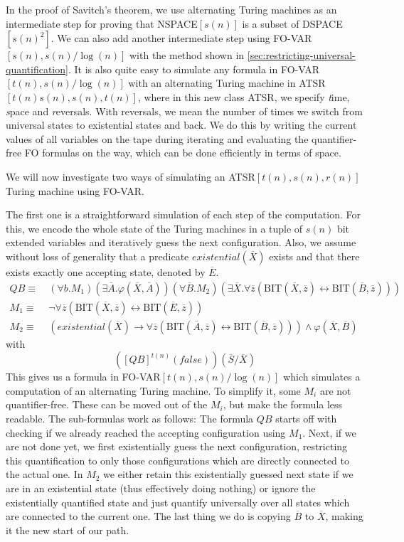 In the proof of Savitch's theorem, we use alternating Turing machines as an intermediate step for proving that NSPACE$[s(n)]$ is a subset of DSPACE$[s(n)^2]$.
We can also add another intermediate step using FO-VAR$[s(n), s(n)/\log(n)]$ with the method shown in \cref{sec:restricting-universal-quantification}.
It is also quite easy to simulate any formula in FO-VAR$[t(n), s(n)/\log(n)]$ with an alternating Turing machine in ATSR$[t(n)s(n), s(n), t(n)]$, where in this new class ATSR, we specify \emph{t}ime, \emph{s}pace and \emph{r}eversals.
With reversals, we mean the number of times we switch from universal states to existential states and back.
We do this by writing the current values of all variables on the tape during iterating and evaluating the quantifier-free FO formulas on the way, which can be done efficiently in terms of space.

We will now investigate two ways of simulating an ATSR$[t(n), s(n), r(n)]$ Turing machine using FO-VAR\@.

The first one is a straightforward simulation of each step of the computation.
For this, we encode the whole state of the Turing machines in a tuple of $s(n)$ bit extended variables and iteratively guess the next configuration.
Also, we assume without loss of generality that a predicate $existential(\overline{X})$ exists and that there exists exactly one accepting state, denoted by $\overline{E}$.
\[
    \begin{aligned}
        QB \equiv~&(\forall b.M_{1})(\exists\overline{A}.\varphi(\overline{X}, \overline{A}))(\forall \overline{B}.M_{2})(\exists \overline{X}. \forall \overline{z}(\text{BIT}(\overline{X}, \overline{z}) \leftrightarrow \text{BIT}(\overline{B}, \overline{z}))) \\
        M_{1} \equiv~&\neg\forall \overline{z}(\text{BIT}(\overline{X}, \overline{z}) \leftrightarrow \text{BIT}(\overline{E}, \overline{z})) \\
        M_{2} \equiv~& (existential(\overline{X}) \to \forall \overline{z}(\text{BIT}(\overline{A}, \overline{z}) \leftrightarrow \text{BIT}(\overline{B}, \overline{z}))) \land \varphi(\overline{X}, \overline{B})
    \end{aligned}
\]
with \[
         \left([QB]^{t(n)}(false)\right)(\overline{S} / \overline{X})
\]
This gives us a formula in FO-VAR$[t(n), s(n)/\log(n)]$ which simulates a computation of an alternating Turing machine.
To simplify it, some $M_i$ are not quantifier-free.
These can be moved out of the $M_i$, but make the formula less readable.
The sub-formulas work as follows:
The formula $QB$ starts off with checking if we already reached the accepting configuration using $M_1$.
Next, if we are not done yet, we first existentially guess the next configuration, restricting this quantification to only those configurations which are directly connected to the actual one.
In $M_2$ we either retain this existentially guessed next state if we are in an existential state (thus effectively doing nothing) or ignore the existentially quantified state and just quantify universally over all states which are connected to the current one.
The last thing we do is copying $\overline{B}$ to $\overline{X}$, making it the new start of our path.


